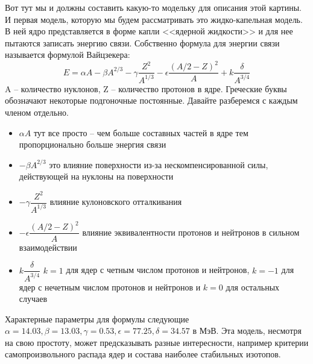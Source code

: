 \documentclass[12pt]{article}
\begin{document}
Вот тут мы и должны составить какую-то модельку для описания этой картины. И первая модель, которую мы будем рассматривать это жидко-капельная модель. В ней ядро представляется в форме капли <<ядерной жидкости>> и для нее пытаются записать энергию связи. Собственно формула для энергии связи называется формулой Вайцзекера:
\begin{equation}
    E=\alpha A - \beta A^{2/3} - \gamma \dfrac{Z^2}{A^{1/3}} - \epsilon \dfrac{(A/2-Z)^2}{A} + k\dfrac{\delta}{A^{3/4}}
\end{equation}
A -- количество нуклонов, Z -- количество протонов в ядре. Греческие буквы обозначают некоторые подгоночные постоянные. Давайте разберемся с каждым членом отдельно.
\begin{itemize}
    \item $\alpha A$ тут все просто -- чем больше составных частей в ядре тем пропорционально больше энергия связи
    \item $-\beta A^{2/3}$ это влияние поверхности из-за нескомпенсированной силы, действующей на нуклоны на поверхности
    \item $-\gamma \dfrac{Z^2}{A^{1/3}}$ влияние кулоновского отталкивания
    \item $-\epsilon \dfrac{(A/2-Z)^2}{A}$ влияние эквивалентности протонов и нейтронов в сильном взаимодействии
    \item $k\dfrac{\delta}{A^{3/4}}$ $k=1$ для ядер с четным числом протонов и нейтронов, $k=-1$ для ядер с нечетным числом протонов и нейтронов и $k=0$ для остальных случаев
\end{itemize}
Характерные параметры для формулы следующие $\alpha = 14.03, \beta = 13.03, \gamma = 0.53, \epsilon = 77.25, \delta = 34.57$ в МэВ. Эта модель, несмотря на свою простоту, может предсказывать разные интересности, например критерии самопроизвольного распада ядер и состава наиболее стабильных изотопов.
\end{document}
